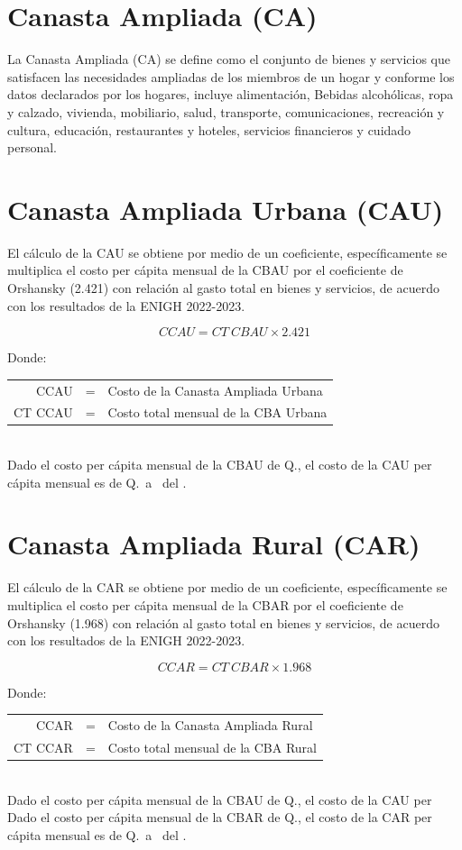 \documentclass[letterpaper, 12pt, twoside]{article}
\begin{document}
\section*{Canasta Ampliada (CA)}

La Canasta Ampliada (CA) se define como el conjunto de bienes y servicios que
satisfacen las necesidades ampliadas de los miembros de un hogar y conforme los
datos declarados por los hogares, incluye alimentación, Bebidas alcohólicas,
ropa y calzado, vivienda, mobiliario, salud, transporte, comunicaciones,
recreación y cultura, educación, restaurantes y hoteles, servicios financieros y
cuidado personal. 

\section*{Canasta Ampliada Urbana (CAU)}

El cálculo de la CAU se obtiene por medio de un coeficiente, específicamente se
multiplica el costo per cápita mensual de la CBAU por el coeficiente de
Orshansky (2.421) con relación al gasto total en bienes y servicios, de acuerdo
con los resultados de la ENIGH 2022-2023.

{\color{AzulAcento} \[CCAU = CT\ CBAU \times 2.421\]}

Donde:

\begin{tabular}{r c l}
  CCAU & = & Costo de la Canasta Ampliada Urbana \\
  CT CCAU & = & Costo total mensual de la CBA Urbana
\end{tabular}
\\[\baselineskip]
Dado el costo per cápita mensual de la CBAU de Q.\CBAU, el costo de la CAU per
cápita mensual es de Q.\CAU\ a \mes\ del \anio.

\section*{Canasta Ampliada Rural (CAR)}

El cálculo de la CAR se obtiene por medio de un coeficiente, específicamente se
multiplica el costo per cápita mensual de la CBAR por el coeficiente de
Orshansky (1.968) con relación al gasto total en bienes y servicios, de acuerdo
con los resultados de la ENIGH 2022-2023.

{\color{AzulAcento} \[CCAR = CT\ CBAR \times 1.968\]}

Donde:

\begin{tabular}{r c l}
  CCAR & = & Costo de la Canasta Ampliada Rural \\
  CT CCAR & = & Costo total mensual de la CBA Rural
\end{tabular}
\\[\baselineskip]
Dado el costo per cápita mensual de la CBAU de Q.\CBAU, el costo de la CAU per
Dado el costo per cápita mensual de la CBAR de Q.\CBAR, el costo de la CAR per
cápita mensual es de Q.\CAR\ a \mes\ del \anio.


\end{document}
